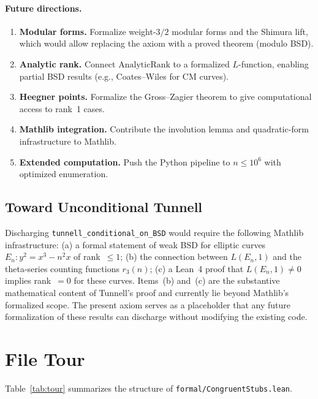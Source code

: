 \documentclass[11pt,a4paper]{article}
\theoremstyle{definition}
\begin{document}
\paragraph{Future directions.}
\begin{enumerate}[nosep]
  \item \textbf{Modular forms.}  Formalize weight-$3/2$ modular
    forms and the Shimura lift, which would allow replacing the
    axiom with a proved theorem (modulo BSD).
  \item \textbf{Analytic rank.}  Connect $\mathrm{AnalyticRank}$
    to a formalized $L$-function, enabling partial BSD results
    (e.g., Coates--Wiles for CM curves).
  \item \textbf{Heegner points.}  Formalize the Gross--Zagier
    theorem to give computational access to rank~1 cases.
  \item \textbf{Mathlib integration.}  Contribute the involution
    lemma and quadratic-form infrastructure to Mathlib.
  \item \textbf{Extended computation.}  Push the Python pipeline
    to $n \le 10^6$ with optimized enumeration.
\end{enumerate}

\subsection*{Toward Unconditional Tunnell}
\label{sec:future-unconditional}

Discharging \texttt{tunnell\_conditional\_on\_BSD} would require
the following Mathlib infrastructure:
(a) a formal statement of weak BSD for elliptic curves
$E_n : y^2 = x^3 - n^2 x$ of rank~$\leq 1$;
(b) the connection between $L(E_n, 1)$ and the theta-series
counting functions $r_3(n)$;
(c) a Lean~4 proof that $L(E_n, 1) \neq 0$ implies rank~$= 0$
for these curves.
Items~(b) and~(c) are the substantive mathematical content of
Tunnell's proof and currently lie beyond Mathlib's formalized
scope.  The present axiom serves as a placeholder that any
future formalization of these results can discharge without
modifying the existing code.

\appendix
\section{File Tour}\label{app:tour}

Table~\ref{tab:tour} summarizes the structure of
\texttt{formal/CongruentStubs.lean}.
\end{document}
